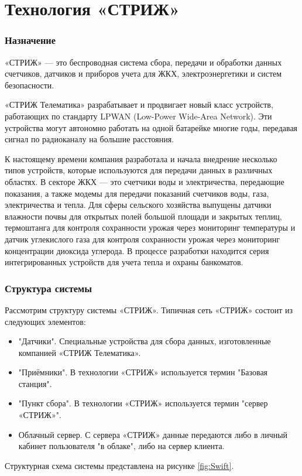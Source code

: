 \section{Технология «СТРИЖ»}
\subsubsection{Назначение}
«СТРИЖ» — это беспроводная система сбора, передачи и обработки данных счетчиков, датчиков и приборов учета для ЖКХ, электроэнергетики и систем безопасности.

«СТРИЖ Телематика» разрабатывает и продвигает новый класс устройств, работающих по стандарту LPWAN (Low-Power Wide-Area Network). Эти устройства могут автономно работать на одной батарейке многие годы, передавая сигнал по радиоканалу на большие расстояния. 


К настоящему времени компания разработала и начала внедрение несколько типов устройств, которые используются для передачи данных в различных областях. В секторе ЖКХ — это счетчики воды и электричества, передающие показания, а также модемы для передачи показаний счетчиков воды, газа, электричества и тепла. Для сферы сельского хозяйства выпущены датчики влажности почвы для открытых полей большой площади и закрытых теплиц, термоштанга для контроля сохранности урожая через мониторинг температуры и датчик углекислого газа для контроля сохранности урожая через мониторинг концентрации диоксида углерода. В процессе разработки находится серия интегрированных устройств для учета тепла и охраны банкоматов.

\subsubsection{Структура системы}
Рассмотрим структуру системы «СТРИЖ». Типичная сеть «СТРИЖ» состоит из следующих элементов: 
\begin{itemize}
	\item"Датчики". Специальные устройства для сбора данных, изготовленные компанией «СТРИЖ Телематика».  
	\item"Приёмники". В технологии «СТРИЖ» используется термин "Базовая станция".
	\item"Пункт сбора". В технологии «СТРИЖ» используется термин "сервер «СТРИЖ»".
	\item Облачный сервер. С сервера «СТРИЖ» данные передаются либо в личный кабинет пользователя "в облаке", либо на сервер клиента.
\end{itemize}
Структурная схема системы представлена на рисунке
\ref{fig:Swift}.

